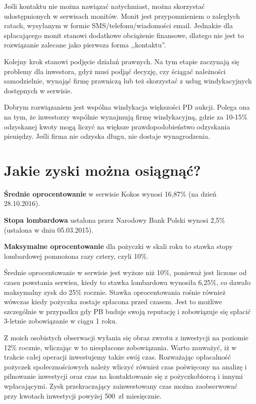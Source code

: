 \documentclass[a4paper,twoside,titlepage,openright]{book}
\begin{document}
Jeśli kontaktu nie można nawiązać natychmiast, można skorzystać udostępnionych w serwisach monitów. Monit jest przypomnieniem o zaległych ratach, wysyłanym w formie SMS/telefonu/wiadomości email. Jednakże dla spłacającego monit stanowi dodatkowe obciążenie finansowe, dlatego nie jest to rozwiązanie zalecane jako pierwsza forma ,,kontaktu''. 

Kolejny krok stanowi podjęcie działań prawnych. Na tym etapie zaczynają się problemy dla inwestora, gdyż musi podjąć decyzję, czy ściągać należności samodzielnie, wynająć firmę prawniczą lub też skorzystać z usług windykacyjnych dostępnych w serwisie. 

Dobrym rozwiązaniem jest wspólna windykacja większości PD aukcji. Polega ona na tym, że inwestorzy wspólnie wynajmują firmę windykacyjną, gdzie za 10-15\% odzyskanej kwoty mogą liczyć na większe prawdopodobieństwo odzyskania pieniędzy. Jeśli firma nie odzyska długu, nie dostaje wynagrodzenia.


\section{Jakie zyski można osiągnąć?}

\textbf{Średnie oprocentowanie} w serwisie Kokos wynosi 16,87\% \cite{zostanInwestorem} (na dzień 28.10.2016).

\textbf{Stopa lombardowa} ustalona przez Narodowy Bank Polski wynosi 2,5\% \cite{stopy} (ustalona w dniu 05.03.2015).
 
\textbf{Maksymalne oprocentowanie} dla pożyczki w skali roku to stawka stopy lombardowej pomnożona razy cztery, czyli 10\%.

Średnie oprocentowanie w serwisie jest wyższe niż 10\%, ponieważ jest liczone od czasu powstania serwisu, kiedy to stawka lombardowa wynosiła 6,25\%, co dawało maksymalny zysk do 25\% rocznie. Stawka oprocentowania rośnie również wówczas kiedy pożyczka zostaje spłacona przed czasem. Jest to możliwe szczególnie w przypadku gdy PB buduje swoją reputację i zobowiązuje się spłacić 3-letnie zobowiązanie w ciągu 1 roku. 

Z moich osobistych obserwacji wyłania się obraz zwrotu z inwestycji na poziomie 12\% rocznie, wliczając w to niespłacone zobowiązania. Warto zauważyć, iż w trakcie całej operacji inwestujemy także swój czas. Rozważając opłacalność pożyczek społecznościowych należy wliczyć również czas poświęcony na analizę i pilnowanie inwestycji oraz czas na kontaktowanie się z pożyczkobiorcą i innymi wpłacającymi. Zysk przekraczający zainwestowany czas można zaobserwować przy kwotach inwestycji powyżej 500~zł miesięcznie. 
\end{document}
